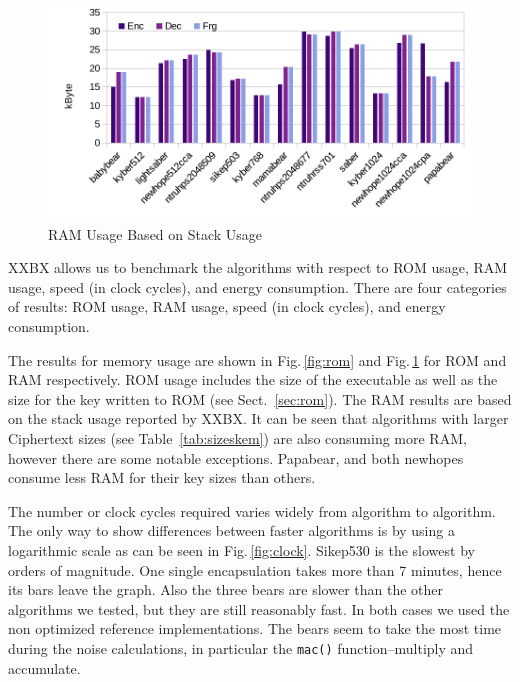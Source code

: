 \documentclass[10pt]{article}
\begin{document}
\begin{figure}[t]
    \centering
    \includegraphics[scale=0.8]{./figures/ram.pdf}
    \caption{RAM Usage Based on Stack Usage}
    \label{fig:ram}
\end{figure}

XXBX allows us to benchmark the algorithms with respect to ROM usage, RAM usage,
speed (in clock cycles), and energy consumption. 
There are four categories of results: ROM usage, RAM usage, speed (in clock cycles), 
and energy consumption.

The results for memory usage are shown in Fig.\,\ref{fig:rom} and Fig.\,\ref{fig:ram} for
ROM and RAM respectively. ROM usage includes the size of the executable as well as the 
size for the key written to ROM (see Sect.~\ref{sec:rom}). 
The RAM results are based on the stack usage reported by XXBX. It can be seen that
algorithms with larger Ciphertext sizes (see Table~\ref{tab:sizeskem}) are also consuming
more RAM, however there are some notable exceptions. Papabear, and both newhopes consume
less RAM for their key sizes than others.



The number or clock cycles required varies widely from algorithm to algorithm. The
only way to show differences between faster algorithms is by using a logarithmic scale
as can be seen in Fig.\,\ref{fig:clock}. Sikep530 is the slowest by orders of magnitude. 
One single encapsulation takes more than 7 minutes, hence its bars leave the graph.
Also the three bears are slower than the other algorithms we tested, 
but they are still reasonably fast. In both cases we used the non optimized reference 
implementations. The bears seem to take the most time during the noise calculations,
in particular the \texttt{mac()} function--multiply and accumulate.
\end{document}
